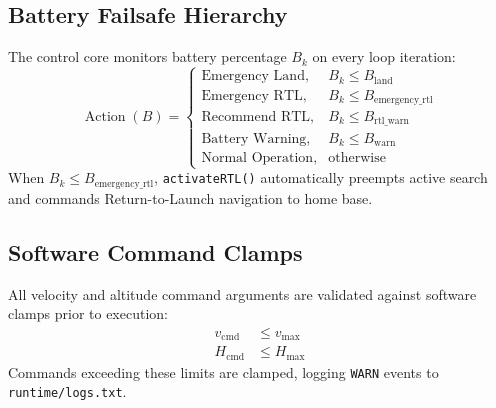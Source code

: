 \subsection{Battery Failsafe Hierarchy}
The control core monitors battery percentage $B_k$ on every loop iteration:
\begin{equation}
\operatorname{Action}(B) = \begin{cases}
\text{Emergency Land}, & B_k \le B_{\mathrm{land}} \\
\text{Emergency RTL}, & B_k \le B_{\mathrm{emergency\_rtl}} \\
\text{Recommend RTL}, & B_k \le B_{\mathrm{rtl\_warn}} \\
\text{Battery Warning}, & B_k \le B_{\mathrm{warn}} \\
\text{Normal Operation}, & \text{otherwise}
\end{cases}
\end{equation}
When $B_k \le B_{\mathrm{emergency\_rtl}}$, \texttt{activateRTL()} automatically preempts active search and commands Return-to-Launch navigation to home base.

\subsection{Software Command Clamps}
All velocity and altitude command arguments are validated against software clamps prior to execution:
\begin{align}
v_{\mathrm{cmd}} &\le v_{\max} \\
H_{\mathrm{cmd}} &\le H_{\max}
\end{align}
Commands exceeding these limits are clamped, logging \texttt{WARN} events to \texttt{runtime/logs.txt}.
